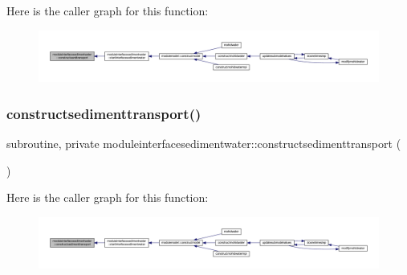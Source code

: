 Here is the caller graph for this function\+:\nopagebreak
\begin{figure}[H]
\begin{center}
\leavevmode
\includegraphics[width=350pt]{namespacemoduleinterfacesedimentwater_a73bbb1dff0427c5f11a6ca3dce2ac6fb_icgraph}
\end{center}
\end{figure}
\mbox{\label{namespacemoduleinterfacesedimentwater_aa1f362c776321b794b1a5798a7a557d7}} 
\subsubsection{\texorpdfstring{constructsedimenttransport()}{constructsedimenttransport()}}
{\footnotesize\ttfamily subroutine, private moduleinterfacesedimentwater\+::constructsedimenttransport (\begin{DoxyParamCaption}{ }\end{DoxyParamCaption})\hspace{0.3cm}{\ttfamily [private]}}

Here is the caller graph for this function\+:\nopagebreak
\begin{figure}[H]
\begin{center}
\leavevmode
\includegraphics[width=350pt]{namespacemoduleinterfacesedimentwater_aa1f362c776321b794b1a5798a7a557d7_icgraph}
\end{center}
\end{figure}
\mbox{\label{namespacemoduleinterfacesedimentwater_a2072a215e8db4306324a2b30c102ae15}} 
